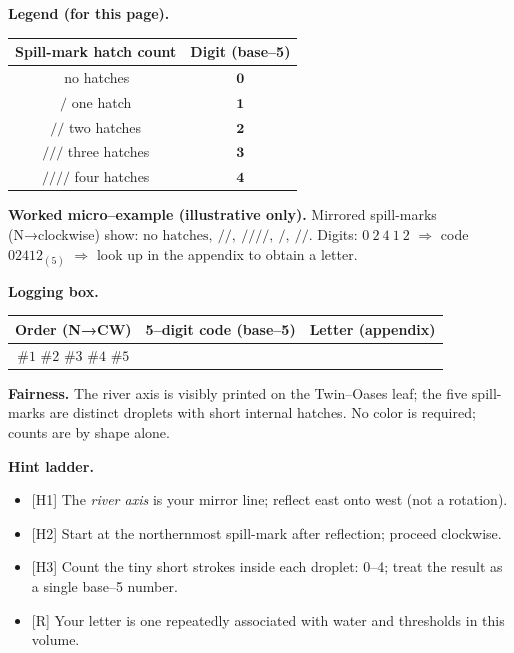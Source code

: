 \documentclass[11pt]{article}
\numberwithin{equation}{section} %
\theoremstyle{plain} %
\theoremstyle{definition} %
\theoremstyle{remark} %
\begin{document}
\medskip
\noindent\textbf{Legend (for this page).}
\begin{center}
\begin{tabular}{c|c}
\textbf{Spill-mark hatch count} & \textbf{Digit (base–5)} \\
\hline
\(\,\)no hatches & \(\mathbf{0}\) \\
\(/\) one hatch & \(\mathbf{1}\) \\
\(/\!\!/\) two hatches & \(\mathbf{2}\) \\
\(/\!\!/\!\!/\) three hatches & \(\mathbf{3}\) \\
\(/\!\!/\!\!/\!\!/\) four hatches & \(\mathbf{4}\) \\
\end{tabular}
\end{center}

\medskip
\noindent\textbf{Worked micro–example (illustrative only).}  
Mirrored spill-marks (N→clockwise) show: \(\text{no hatches},\ /\!\!/,\ /\!\!/\!\!/\!\!/,\ /,\ /\!\!/\).  
Digits: \(0\ 2\ 4\ 1\ 2\) \(\Rightarrow\) code \(02412_{(5)}\) \(\Rightarrow\) look up in the appendix to obtain a letter.

\medskip
\noindent\textbf{Logging box.}
\begin{center}
\begin{tabular}{c|c|c}
\textbf{Order (N→CW)} & \textbf{5–digit code (base–5)} & \textbf{Letter (appendix)} \\
\hline
\(\#1\) \(\#2\) \(\#3\) \(\#4\) \(\#5\) & \hspace{3.5cm} & \hspace{1.2cm} \\
\end{tabular}
\end{center}

\medskip
\noindent\textbf{Fairness.} The river axis is visibly printed on the Twin–Oases leaf; the five spill-marks are distinct droplets with short internal hatches. No color is required; counts are by shape alone.

\medskip
\noindent\textbf{Hint ladder.}
\begin{itemize}\setlength\itemsep{0.25em}
  \item \textsc{[H1]} The \emph{river axis} is your mirror line; reflect east onto west (not a rotation).
  \item \textsc{[H2]} Start at the northernmost spill-mark after reflection; proceed clockwise.
  \item \textsc{[H3]} Count the tiny short strokes inside each droplet: 0–4; treat the result as a single base–5 number.
  \item \textsc{[R]} Your letter is one repeatedly associated with water and thresholds in this volume.
\end{itemize}
\end{document}
